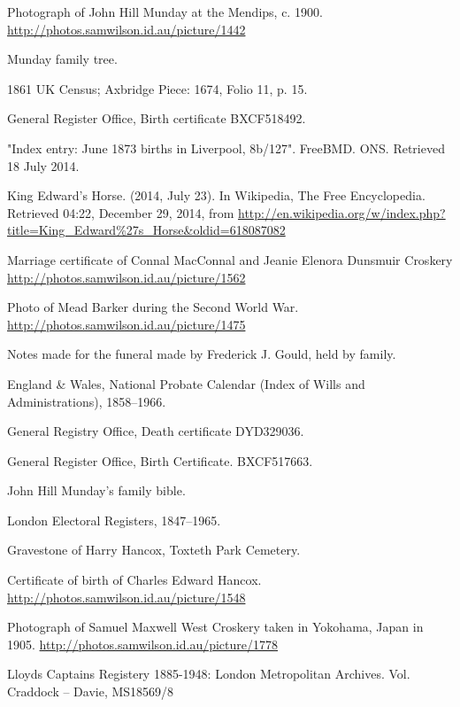 \begin{thebibliography}{99}
	Photograph of John Hill Munday at the Mendips, c. 1900.
	\url{http://photos.samwilson.id.au/picture/1442}

	Munday family tree.

	1861 UK Census; Axbridge Piece: 1674, Folio 11, p. 15.

	General Register Office, Birth certificate BXCF518492.

	"Index entry: June 1873 births in Liverpool, 8b/127". FreeBMD. ONS. Retrieved 18 July 2014. 

	King Edward's Horse. (2014, July 23). In Wikipedia, The Free Encyclopedia. Retrieved 04:22, December 29, 2014,
	from \url{http://en.wikipedia.org/w/index.php?title=King_Edward\%27s_Horse&oldid=618087082}

	Marriage certificate of Connal MacConnal and Jeanie Elenora Dunsmuir Croskery
	\url{http://photos.samwilson.id.au/picture/1562}

	Photo of Mead Barker during the Second World War. \\
	\url{http://photos.samwilson.id.au/picture/1475}

	Notes made for the funeral made by Frederick J. Gould, held by family.

	England \& Wales, National Probate Calendar (Index of Wills and Administrations), 1858--1966.

	General Registry Office, Death certificate DYD329036.

	General Register Office, Birth Certificate. BXCF517663.

	John Hill Munday's family bible.

	London Electoral Registers, 1847--1965.

	Gravestone of Harry Hancox, Toxteth Park Cemetery.

	Certificate of birth of Charles Edward Hancox. \url{http://photos.samwilson.id.au/picture/1548}

	Photograph of Samuel Maxwell West Croskery taken in Yokohama, Japan in 1905.
	\url{http://photos.samwilson.id.au/picture/1778}

	Lloyds Captains Registery 1885-1948: London Metropolitan Archives. Vol. Craddock -- Davie, MS18569/8


\end{thebibliography}
